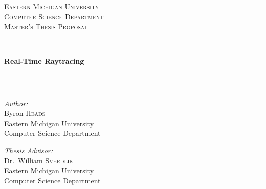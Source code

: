 \documentclass[11pt,a4paper,oneside]{article}
\newcommand{\HRule}{\rule{\linewidth}{0.5mm}}
\begin{document}
\begin{titlepage}
    \begin{center}
        \textsc{\large Eastern Michigan University}\\[1.5cm]
        \textsc{\large Computer Science Department}\\
        \textsc{\large Master's Thesis Proposal}\\[0.5cm]
        \HRule\\[0.4cm]
        { \huge \bfseries  Real-Time Raytracing }\\[0.4cm]
        \HRule\\[1.5cm]

        \begin{minipage}{0.45\textwidth}
            \begin{flushleft} \large
                \emph{Author:}\\
                Byron \textsc{Heads} \\
                \small Eastern Michigan University\\
                \small Computer Science Department \\
            \end{flushleft}
        \end{minipage}
        \begin{minipage}{0.45\textwidth}
            \begin{flushright} \large
                \emph{Thesis Advisor:} \\
                Dr.~William \textsc{Sverdlik}\\
                \small Eastern Michigan University\\
                \small Computer Science Department
            \end{flushright}
        \end{minipage}

        \vfill


\end{center}
\end{titlepage}
\end{document}
